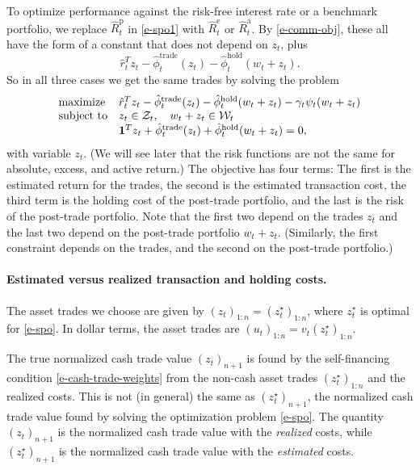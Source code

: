 \documentclass[openany]{now}
\newcommand{\trcosthat}{\hat \phi^\mathrm{trade}}
\newcommand{\hldcosthat}{\hat \phi^\mathrm{hold}}
\newcommand{\Rphat}{\hat R^\mathrm{p}}
\newcommand{\Rehat}{\hat R^\mathrm{e}}
\newcommand{\Rahat}{\hat R^\mathrm{a}}
\begin{document}
To optimize performance against the risk-free interest rate
or a benchmark portfolio,
we replace $\Rphat_t$ in \eqref{e-spo1} with $\Rehat_t$ or $\Rahat_t$.
By \eqref{e-comm-obj}, these all have the form of a
constant that does not depend on $z_t$, plus
\[
\hat r_t ^T z_t - \trcosthat_t (z_t) - \hldcosthat_t (w_t + z_t).
\]
So in all three cases we get the same trades by solving the problem
\begin{equation}\label{e-spo}
\begin{array}{ll}
\mbox{maximize} &
\hat r_t^T z_t
- \trcosthat_t (z_t) - \hldcosthat_t (w_t + z_t)
-\gamma_t \psi_t(w_t+z_t)\\
\mbox{subject to} &
z_t \in \mathcal Z_t, \quad
w_t + z_t \in \mathcal W_t \\
& \ones^Tz_t + \trcosthat_t (z_t) + \hldcosthat_t (w_t + z_t) = 0,
\end{array}
\end{equation}
with variable $z_t$.
(We will see later that the risk functions are not the same for absolute, excess, and
active return.)
The objective has four terms: The first is the estimated return
for the trades, the second is the estimated transaction cost,
the third term is the holding cost of the post-trade portfolio,
and the last is the risk of the post-trade portfolio.
Note that the first two depend on the trades $z_t$ and the last two
depend on the post-trade portfolio $w_t+z_t$.
(Similarly, the first constraint depends on the trades, and the second on
the post-trade portfolio.)

\paragraph{Estimated versus realized transaction and holding costs.}
The asset trades we choose are given by $(z_t)_{1:n}=(z_t^\star)_{1:n}$,
where $z_t^\star$ is optimal for \eqref{e-spo}.
In dollar terms, the asset trades are $(u_t)_{1:n}=v_t(z_t^\star)_{1:n}$.

The true normalized cash trade value $(z_t)_{n+1}$ is
found by the self-financing
condition \eqref{e-cash-trade-weights} from the non-cash asset trades
$(z^\star_t)_{1:n}$ and the realized costs.
This is not (in general) the same as $(z_t^\star)_{n+1}$,
the normalized cash trade value found by solving the
optimization problem \eqref{e-spo}.
The quantity $(z_t)_{n+1}$ is the normalized cash trade value with the
\emph{realized} costs, while $(z_t^\star)_{n+1}$ is the normalized cash trade value
with the \emph{estimated} costs.
\end{document}
